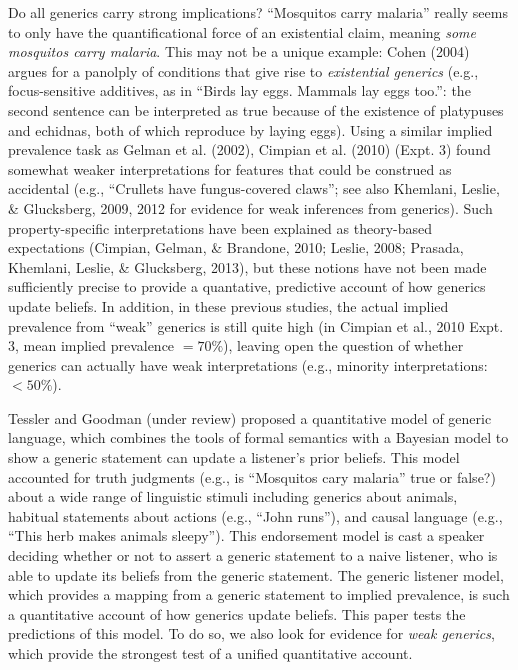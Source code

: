 \documentclass[floatsintext,man]{apa6}
\theoremstyle{definition}
\theoremstyle{definition}
\theoremstyle{definition}
\theoremstyle{remark}
\begin{document}
Do all generics carry strong implications? \enquote{Mosquitos carry
malaria} really seems to only have the quantificational force of an
existential claim, meaning \emph{some mosquitos carry malaria}. This may
not be a unique example: Cohen (2004) argues for a panolply of
conditions that give rise to \emph{existential generics} (e.g.,
focus-sensitive additives, as in \enquote{Birds lay eggs. Mammals lay
eggs too.}: the second sentence can be interpreted as true because of
the existence of platypuses and echidnas, both of which reproduce by
laying eggs). Using a similar implied prevalence task as Gelman et al.
(2002), Cimpian et al. (2010) (Expt. 3) found somewhat weaker
interpretations for features that could be construed as accidental
(e.g., ``Crullets have fungus-covered claws''; see also Khemlani,
Leslie, \& Glucksberg, 2009, 2012 for evidence for weak inferences from
generics). Such property-specific interpretations have been explained as
theory-based expectations (Cimpian, Gelman, \& Brandone, 2010; Leslie,
2008; Prasada, Khemlani, Leslie, \& Glucksberg, 2013), but these notions
have not been made sufficiently precise to provide a quantative,
predictive account of how generics update beliefs. In addition, in these
previous studies, the actual implied prevalence from \enquote{weak}
generics is still quite high (in Cimpian et al., 2010 Expt. 3, mean
implied prevalence \(= 70\%\)), leaving open the question of whether
generics can actually have weak interpretations (e.g., minority
interpretations: \(< 50\%\)).

Tessler and Goodman (under review) proposed a quantitative model of
generic language, which combines the tools of formal semantics with a
Bayesian model to show a generic statement can update a listener's prior
beliefs. This model accounted for truth judgments (e.g., is
\enquote{Mosquitos cary malaria} true or false?) about a wide range of
linguistic stimuli including generics about animals, habitual statements
about actions (e.g., \enquote{John runs}), and causal language (e.g.,
\enquote{This herb makes animals sleepy}). This endorsement model is
cast a speaker deciding whether or not to assert a generic statement to
a naive listener, who is able to update its beliefs from the generic
statement. The generic listener model, which provides a mapping from a
generic statement to implied prevalence, is such a quantitative account
of how generics update beliefs. This paper tests the predictions of this
model. To do so, we also look for evidence for \emph{weak generics},
which provide the strongest test of a unified quantitative account.
\end{document}
